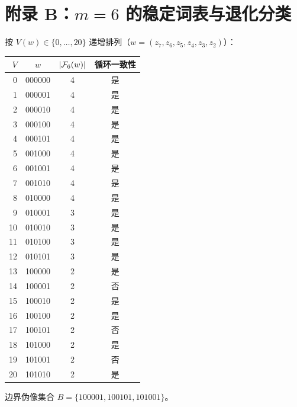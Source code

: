 \section{附录 B：\texorpdfstring{$m=6$}{m=6} 的稳定词表与退化分类}

按 $V(w)\in\{0,\dots,20\}$ 递增排列（$w=(z_7,z_6,z_5,z_4,z_3,z_2)$）：

\begin{center}
\begin{tabular}{r c c c}
\toprule
$V$ & $w$ & $\left\lvert \mathcal{F}_6(w)\right\rvert$ & 循环一致性\\
\midrule
0  & 000000 & 4 & 是\\
1  & 000001 & 4 & 是\\
2  & 000010 & 4 & 是\\
3  & 000100 & 4 & 是\\
4  & 000101 & 4 & 是\\
5  & 001000 & 4 & 是\\
6  & 001001 & 4 & 是\\
7  & 001010 & 4 & 是\\
8  & 010000 & 4 & 是\\
9  & 010001 & 3 & 是\\
10 & 010010 & 3 & 是\\
11 & 010100 & 3 & 是\\
12 & 010101 & 3 & 是\\
13 & 100000 & 2 & 是\\
14 & 100001 & 2 & 否\\
15 & 100010 & 2 & 是\\
16 & 100100 & 2 & 是\\
17 & 100101 & 2 & 否\\
18 & 101000 & 2 & 是\\
19 & 101001 & 2 & 否\\
20 & 101010 & 2 & 是\\
\bottomrule
\end{tabular}
\end{center}

边界伪像集合 $B=\{100001,100101,101001\}$。

